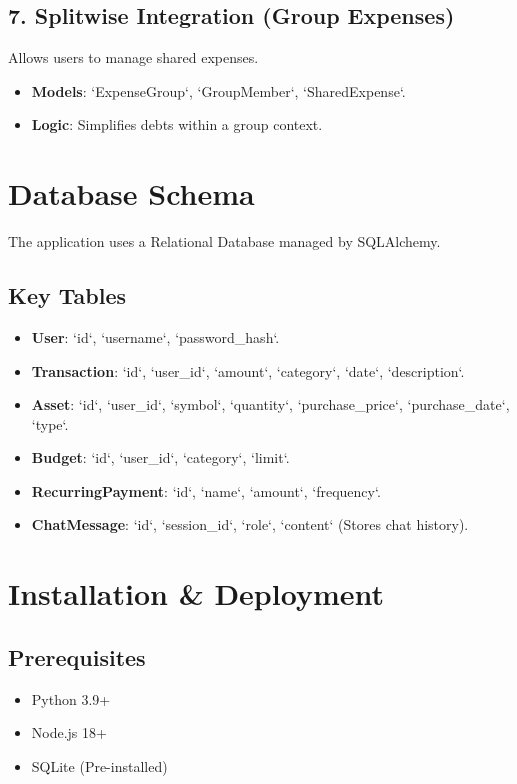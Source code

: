 \documentclass[12pt, a4paper]{report}
\begin{document}
\section{7. Splitwise Integration (Group Expenses)}
Allows users to manage shared expenses.
\begin{itemize}
    \item \textbf{Models}: `ExpenseGroup`, `GroupMember`, `SharedExpense`.
    \item \textbf{Logic}: Simplifies debts within a group context.
\end{itemize}

\chapter{Database Schema}
The application uses a Relational Database managed by SQLAlchemy.

\section{Key Tables}
\begin{itemize}
    \item \textbf{User}: `id`, `username`, `password_hash`.
    \item \textbf{Transaction}: `id`, `user_id`, `amount`, `category`, `date`, `description`.
    \item \textbf{Asset}: `id`, `user_id`, `symbol`, `quantity`, `purchase_price`, `purchase_date`, `type`.
    \item \textbf{Budget}: `id`, `user_id`, `category`, `limit`.
    \item \textbf{RecurringPayment}: `id`, `name`, `amount`, `frequency`.
    \item \textbf{ChatMessage}: `id`, `session_id`, `role`, `content` (Stores chat history).
\end{itemize}

\chapter{Installation & Deployment}
\section{Prerequisites}
\begin{itemize}
    \item Python 3.9+
    \item Node.js 18+
    \item SQLite (Pre-installed)
\end{itemize}
\end{document}
